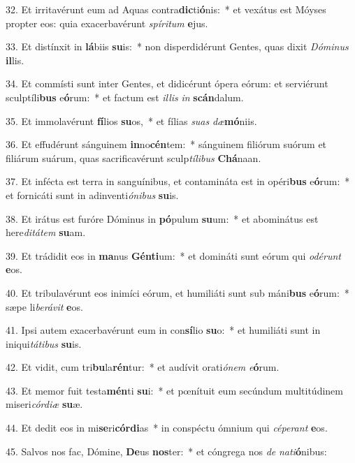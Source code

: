 32. Et irritavérunt eum ad Aquas contra\textbf{dic}ti\textbf{ó}nis:~*  et vexátus est Móyses propter eos: quia exacerbavérunt \textit{spí}\textit{ri}\textit{tum} \textbf{e}jus.\

33. Et distínxit in \textbf{lá}biis \textbf{su}is:~*  non disperdidérunt Gentes, quas dixit \textit{Dó}\textit{mi}\textit{nus} \textbf{il}lis.\

34. Et commísti sunt inter Gentes, et didicérunt ópera eórum: et serviérunt sculptíli\textbf{bus} e\textbf{ó}rum:~*  et factum est \textit{il}\textit{lis} \textit{in} \textbf{scán}dalum.\

35. Et immolavérunt \textbf{fí}lios \textbf{su}os,~*  et fílias \textit{su}\textit{as} \textit{dæ}\textbf{mó}niis.\

36. Et effudérunt sánguinem \textbf{in}no\textbf{cén}tem:~*  sánguinem filiórum suórum et filiárum suárum, quas sacrificavérunt sculp\textit{tí}\textit{li}\textit{bus} \textbf{Chá}naan.\

37. Et infécta est terra in sanguínibus, et contamináta est in opéri\textbf{bus} e\textbf{ó}rum:~*  et fornicáti sunt in adinventi\textit{ó}\textit{ni}\textit{bus} \textbf{su}is.\

38. Et irátus est furóre Dóminus in \textbf{pó}pulum \textbf{su}um:~*  et abominátus est here\textit{di}\textit{tá}\textit{tem} \textbf{su}am.\

39. Et trádidit eos in \textbf{ma}nus \textbf{Gén}\textbf{ti}um:~*  et domináti sunt eórum qui \textit{o}\textit{dé}\textit{runt} \textbf{e}os.\

40. Et tribulavérunt eos inimíci eórum, et humiliáti sunt sub máni\textbf{bus} e\textbf{ó}rum:~*  sæpe li\textit{be}\textit{rá}\textit{vit} \textbf{e}os.\

41. Ipsi autem exacerbavérunt eum in con\textbf{sí}lio \textbf{su}o:~*  et humiliáti sunt in iniqui\textit{tá}\textit{ti}\textit{bus} \textbf{su}is.\

42. Et vidit, cum tri\textbf{bu}la\textbf{rén}tur:~*  et audívit orati\textit{ó}\textit{nem} \textit{e}\textbf{ó}rum.\

43. Et memor fuit testa\textbf{mén}ti \textbf{su}i:~*  et pœnítuit eum secúndum multitúdinem miseri\textit{cór}\textit{di}\textit{æ} \textbf{su}æ.\

44. Et dedit eos in mi\textbf{se}ri\textbf{cór}\textbf{di}as~*  in conspéctu ómnium qui \textit{cé}\textit{pe}\textit{rant} \textbf{e}os.\

45. Salvos nos fac, Dómine, \textbf{De}us \textbf{nos}ter:~*  et cóngrega nos \textit{de} \textit{na}\textit{ti}\textbf{ó}nibus:\

